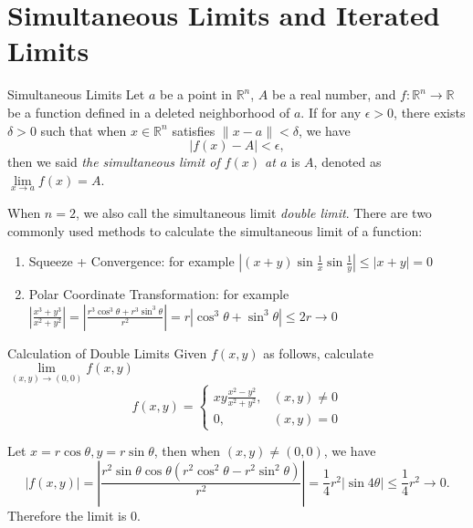 

\section{Simultaneous Limits and Iterated Limits}

\begin{definition}{Simultaneous Limits}{}
  Let $a$ be a point in $\mathbb{R}^n$,
  $A$ be a real number,
  and $f: \mathbb{R}^n \rightarrow \mathbb{R}$ be a function defined in
  a deleted neighborhood of $a$.
  If for any $\epsilon > 0$, there exists $\delta > 0$ such that
  when $x \in \mathbb{R}^n$ satisfies $\|x - a\| < \delta$,
  we have
  \begin{equation}
   |f(x) - A| < \epsilon,
  \end{equation}
  then we said \emph{the simultaneous limit of $f(x)$ at $a$} is $A$,
  denoted as $\lim \limits _{x \rightarrow a} f(x) = A$.
\end{definition}

\begin{note}
  When $n = 2$, we also call the simultaneous limit \emph{double limit}.
  There are two commonly used methods to calculate the simultaneous limit of a function:
  \begin{enumerate}
  \item Squeeze + Convergence: for example $\left|(x+y)\sin\frac{1}{x}\sin\frac{1}{y}\right|\leq|x+y|=0$
  \item Polar Coordinate Transformation: for example
    $\left|{\frac{x^{3}+y^{3}}{x^{2}+y^{2}}}\right|=\left|{\frac{r^{3}\cos^{3}\theta+r^{3}\sin^{3}\theta}{r^{2}}}\right|=r|\cos^{3}\theta+\sin^{3}\theta|\leq2r\rightarrow
    0$
  \end{enumerate}
\end{note}

\begin{example}{Calculation of Double Limits}{}
  Given $f(x, y)$ as follows, calculate $\lim \limits _{(x,y) \rightarrow (0,
    0)} f(x,y)$
  \begin{equation}
    f(x,y)=
    \begin{cases}
      xy\frac{x^2-y^2}{x^2+y^2},&(x,y)\neq 0\\
      0,&(x,y)=0
    \end{cases}
  \end{equation}
\end{example}

\begin{solution}
  Let $x = r \cos \theta, y = r \sin \theta$,
  then when $(x, y) \neq (0, 0)$, we have
  \begin{equation}
    |f(x,y)|=\left|\frac{r^2\sin\theta\cos\theta(r^2\cos^2\theta-r^2\sin^2\theta)}{r^2}\right|=\frac{1}{4}r^2|\sin4\theta|\leq\frac{1}{4}r^2\to 0.
  \end{equation}
  Therefore the limit is $0$.
\end{solution}

